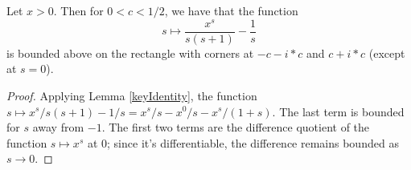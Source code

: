 \begin{lemma}[diffBddAtZero]
\label{diffBddAtZero}
\leanok
Let $x>0$. Then for $0 < c < 1 /2$, we have that the function
  $$
  s ↦ \frac{x^s}{s(s+1)} - \frac1s
  $$
  is bounded above on the rectangle with corners at $-c-i*c$ and $c+i*c$ (except at $s=0$).
\end{lemma}
\begin{proof}
\leanok
Applying Lemma \ref{keyIdentity}, the
   function $s ↦ x^s/s(s+1) - 1/s = x^s/s - x^0/s - x^s/(1+s)$. The last term is bounded for $s$
   away from $-1$. The first two terms are the difference quotient of the function $s ↦ x^s$ at
   $0$; since it's differentiable, the difference remains bounded as $s\to 0$.
\end{proof}
